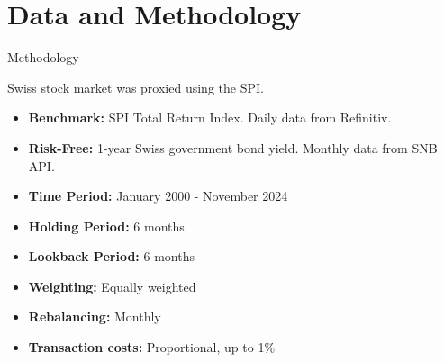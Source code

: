 \documentclass[10pt]{beamer}
\begin{document}
\section{Data and Methodology}
\begin{frame}[fragile]{Methodology}

\noindent %
\begin{minipage}[t]{0.45\textwidth} %
    \begin{tcolorbox}[colframe=datagreen, colback=boxbg, coltitle=white, title=Data, sharp corners=all, fonttitle=\bfseries, left=2mm, right=2mm, enhanced, height=6cm]
        Swiss stock market was proxied using the SPI. 
        \begin{itemize}
            \item \textbf{Benchmark:} SPI Total Return Index. Daily data from Refinitiv.
            \item \textbf{Risk-Free:} 1-year Swiss government bond yield. Monthly data from SNB API.
            \item \textbf{Time Period:} January 2000 - November 2024
        \end{itemize}
    \end{tcolorbox}
\end{minipage}%
\hspace{0.05\textwidth} %
\begin{minipage}[t]{0.45\textwidth} %
    \begin{tcolorbox}[colframe=strategyblue, colback=boxbg, coltitle=white, title=Methodology, sharp corners=all, fonttitle=\bfseries, left=2mm, right=2mm, enhanced, height=6cm]
        \begin{itemize}
            \item \textbf{Holding Period:} 6 months
            \item \textbf{Lookback Period:} 6 months
            \item \textbf{Weighting:} Equally weighted
            \item \textbf{Rebalancing:} Monthly
            \item \textbf{Transaction costs:} Proportional, up to 1\%
            
        \end{itemize}
    \end{tcolorbox}
\end{minipage}

\end{frame}
\end{document}
